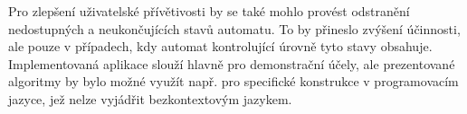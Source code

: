 Pro zlepšení uživatelské přívětivosti by se také mohlo provést odstranění
nedostupných a neukončujících stavů automatu. To by přineslo zvýšení účinnosti,
ale pouze v případech, kdy automat kontrolující úrovně tyto stavy obsahuje.\\

Implementovaná aplikace slouží hlavně pro demonstrační účely, ale prezentované
algoritmy by bylo možné využít např. pro specifické konstrukce v programovacím
jazyce, jež nelze vyjádřit bezkontextovým jazykem.

